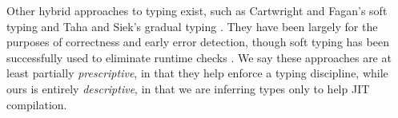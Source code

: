 Other hybrid approaches to typing exist, such as Cartwright and Fagan's soft
typing and Taha and Siek's gradual typing \cite{Cartwright91, Siek07}. They
have been largely for the purposes of correctness and early error
detection, though soft typing has been successfully used to eliminate runtime checks \cite{Wright97}.
We say these approaches are at least partially \emph{prescriptive}, in that they
help enforce a typing discipline, while ours is entirely \emph{descriptive}, in that
we are inferring types only to help JIT compilation.




